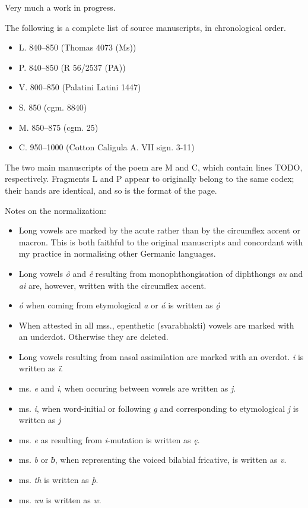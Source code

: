 
Very much a work in progress.

The following is a complete list of source manuscripts, in chronological order.

\begin{itemize}
  \item L. 840–850 (Thomas 4073 (Ms))
  \item P. 840–850 (R 56/2537 (PA))
  \item V. 800–850 (Palatini Latini 1447)
  \item S. 850 (cgm. 8840)
  \item M. 850–875 (cgm. 25)
  \item C. 950–1000 (Cotton Caligula A. VII sign. 3-11)
\end{itemize}

The two main manuscripts of the poem are M and C, which contain lines TODO, respectively.  Fragments L and P appear to originally belong to the same codex; their hands are identical, and so is the format of the page.


Notes on the normalization:
  \begin{itemize}
    \item Long vowels are marked by the acute rather than by the circumflex accent or macron. This is both faithful to the original manuscripts and concordant with my practice in normalising other Germanic languages.
    \item Long vowels \emph{ô} and \emph{ê} resulting from monophthongisation of diphthongs \emph{au} and \emph{ai} are, however, written with the circumflex accent.
    \item \emph{ó} when coming from etymological \emph{a} or \emph{á} is written as \emph{ǫ́}
    \item When attested in all mss., epenthetic (svarabhakti) vowels are marked with an underdot. Otherwise they are deleted.
    \item Long vowels resulting from nasal assimilation are marked with an overdot. \emph{i} is written as \emph{ï}.
    \item ms. \emph{e} and \emph{i}, when occuring between vowels are written as \emph{j}.
    \item ms. \emph{i}, when word-initial or following \emph{g} and corresponding to etymological \emph{j} is written as \emph{j}
    \item ms. \emph{e} as resulting from \emph{i}-mutation is written as \emph{ę}.
    \item ms. \emph{b} or \emph{ƀ}, when representing the voiced bilabial fricative, is written as \emph{v}.
    \item ms. \emph{th} is written as \emph{þ}.
    \item ms. \emph{uu} is written as \emph{w}.
  \end{itemize}

